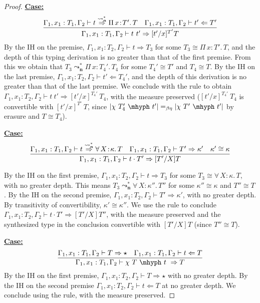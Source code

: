 \documentclass{article}
\newcommand{\abs}[4]{{#1}\, #2\! : \! #3.\, #4}
\newcommand{\leadstocs}[0]{\ensuremath{\leadsto_{\mathbf{n}}^*}}
\newcommand{\tpcheck}[0]{\Leftarrow}
\newcommand{\tpsynth}[0]{\Rightarrow}
\newcommand{\tpsynthleads}[0]{\ensuremath{\overset{\leadstocs}{\Rightarrow}}}
\newcommand{\startcase}[1]{\vspace{#1} \noindent\textbf{\underline{Case:}}}
\begin{document}
\begin{proof}
  \startcase{.2cm}
  \[
    \infer{
      \Gamma_1,x_1:T_1,\Gamma_2 \vdash t\ t' \tpsynth [t'/x]^{T'}T
    }{
      \Gamma_1,x_1:T_1,\Gamma_2 \vdash t \tpsynthleads \abs{\Pi}{x}{T'}{T}
      & \Gamma_1,x_1:T_1,\Gamma_2 \vdash t' \tpcheck T'
    }
  \]
  By the IH on the premise, \(\Gamma_1,x_1:T_2,\Gamma_2 \vdash t \tpsynth T_3\)
  for some \(T_3 \cong \abs{\Pi}{x}{T'}{T}\), and the depth of this typing
  derivation is no greater than that of the first premise.
  From this we obtain that \(T_3 \leadstocs \abs{\Pi}{x}{T_4'}{T_4}\) for
  some \(T_4' \cong T'\) and \(T_4 \cong T\).
  By the IH on the last premise, \(\Gamma_1,x_1:T_2,\Gamma_2 \vdash t' \tpcheck
  T_4'\), and the depth of this derivation is no greater than that of the last premise.
  We conclude with the rule to obtain \(\Gamma_1,x_1:T_2,\Gamma_2 \vdash t\ t'
  \tpsynth [t'/x]^{T_4'}\ T_4\), with the measure preserved (\([t'/x]^{T_4'}\
  T_4\) is convertible with \([t'/x]^{T'}\ T\), since \(|\chi\ T_4'\ \mhyph\ t'|
  =_{\beta\eta} |\chi\ T'\ \mhyph\ t'|\) by erasure and \(T \cong T_4\)).

  \startcase{.2cm}
  \[
    \infer{
      \Gamma_1,x_1:T_1,\Gamma_2 \vdash t \cdot T' \tpsynth [T'/X]T
    }{
      \Gamma_1,x_1:T_1,\Gamma_2 \vdash t \tpsynthleads
      \abs{\forall}{X}{\kappa}{T}
      & \Gamma_1,x_1:T_1,\Gamma_2 \vdash T' \tpsynth \kappa'
      & \kappa'\cong\kappa
    }
  \]

  By the IH on the first premise, \(\Gamma_1,x_1:T_2,\Gamma_2 \vdash t \tpsynth
  T_3\) for some \(T_3 \cong \abs{\forall}{X}{\kappa}{T}\), with no greater
  depth.
  This means \(T_3 \leadstocs \abs{\forall}{X}{\kappa''}{T''}\) for some
  \(\kappa'' \cong \kappa\) and \(T'' \cong T\).
  By the IH on the second premise, \(\Gamma_1,x_1:T_2,\Gamma_2 \vdash T'
  \tpsynth \kappa'\), with no greater depth.
  By transitivity of convertibility, \(\kappa' \cong \kappa''\).
  We use the rule to conclude \(\Gamma_1,x_1:T_2,\Gamma_2 \vdash t \cdot T'
  \tpsynth [T'/X]T''\), with the measure preserved and the synthesized type in
  the conclusion convertible with \([T'/X]T\) (since \(T'' \cong T\)).

  \startcase{.2cm}
  \[
    \infer{
      \Gamma_1,x_1:T_1,\Gamma_2 \vdash \chi\ T\ \mhyph\ t\ \tpsynth T
    }{
      \Gamma_1,x_1:T_1,\Gamma_2 \vdash T \tpsynth \star
      & \Gamma_1,x_1:T_1,\Gamma_2 \vdash t \tpcheck T
    }
  \]
  By the IH on the first premise, \(\Gamma_1,x_1:T_2,\Gamma_2 \vdash T \tpsynth
  \star\) with no greater depth.
  By the IH on the second premise \(\Gamma_1,x_1:T_2,\Gamma_2 \vdash t \tpcheck
  T\) at no greater depth.
  We conclude using the rule, with the measure preserved.
\end{proof}
\end{document}
